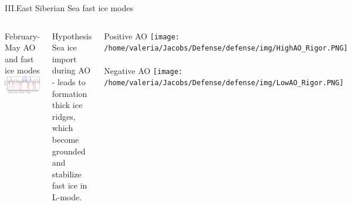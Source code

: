 \documentclass[8pt]{beamer}
\begin{document}
\setwatermark{\fontsize{125pt}{125pt}\selectfont{}}
\begin{frame}[fragile]{III.East Siberian Sea fast ice modes}
\begin{center}
\begin{columns}
	\centering
	February-May AO and fast ice modes
	\includegraphics[width=1\textwidth]{./img/AO.pdf}\\~\\
	\begin{block}{Hypothesis}
		Sea ice import during AO - leads to formation thick ice ridges, which become grounded and stabilize fast ice in L-mode.
	\end{block}
	Positive AO
	\texttt{[image: /home/valeria/Jacobs/Defense/defense/img/HighAO\_Rigor.PNG]}\\~\\
	Negative AO
	\texttt{[image: /home/valeria/Jacobs/Defense/defense/img/LowAO\_Rigor.PNG]}
\end{columns}	


\end{center}
\end{frame}
\end{document}
